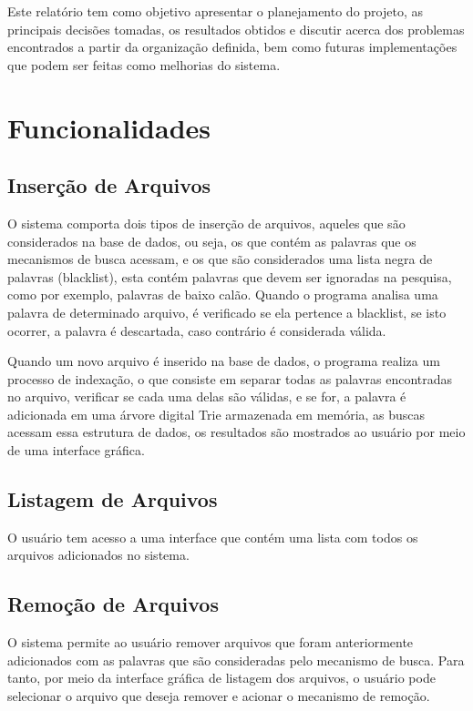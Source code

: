 \documentclass[12pt]{article}
\begin{document}
Este relatório tem como objetivo apresentar o planejamento do projeto, as principais decisões tomadas, os resultados obtidos e discutir acerca dos problemas encontrados a partir da organização definida, bem como futuras implementações que podem ser feitas como melhorias do sistema.

\section{Funcionalidades}
\subsection{Inserção de Arquivos}

O sistema comporta dois tipos de inserção de arquivos, aqueles que são considerados na base de dados, ou seja, os que contém as palavras que os mecanismos de busca acessam, e os que são considerados uma lista negra de palavras (blacklist), esta contém palavras que devem ser ignoradas na pesquisa, como por exemplo, palavras de baixo calão. Quando o programa analisa uma palavra de determinado arquivo, é verificado se ela pertence a blacklist, se isto ocorrer, a palavra é descartada, caso contrário é considerada válida. 

Quando um novo arquivo é inserido na base de dados, o programa realiza um processo de indexação, o que consiste em separar todas as palavras encontradas no arquivo, verificar se cada uma delas são válidas, e se for, a palavra é adicionada em uma árvore digital Trie armazenada em memória, as buscas acessam essa estrutura de dados, os resultados são mostrados ao usuário por meio de uma interface gráfica.

\subsection{Listagem de Arquivos}
O usuário tem acesso a uma interface que contém uma lista com todos os arquivos adicionados no sistema.

\subsection{Remoção de Arquivos}
O sistema permite ao usuário remover arquivos que foram anteriormente adicionados com as palavras que são consideradas pelo mecanismo de busca. Para tanto, por meio da interface gráfica de listagem dos arquivos, o usuário pode selecionar o arquivo que deseja remover e acionar o mecanismo de remoção.
\end{document}
